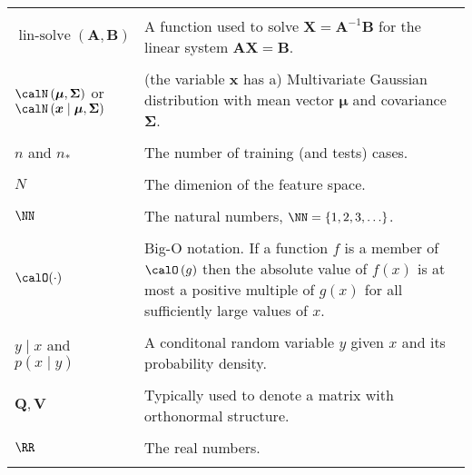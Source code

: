 \begin{longtable}{lp{}}
    \\\\
    $\operatorname{lin-solve} \left( \bm{A}, \bm{B} \right)$                                                   & A function used to solve $\bm{X} = \bm{A}^{-1} \bm{B}$ for the linear system $\bm{A} \bm{X} = \bm{B}$.
    \\\\
    $\calN \left( \bm{\mu} , \bm{\Sigma} \right)$ or $\calN \left( \bm{x} \mid \bm{\mu} , \bm{\Sigma} \right)$ & (the variable $\bm{x}$ has a) Multivariate Gaussian distribution with mean vector $\bm{\mu}$ and covariance $\bm{\Sigma}$.
    \\\\
    $n$ and $n_{\ast}$                                                                                         & The number of training (and tests) cases.
    \\\\
    $N$                                                                                                        & The dimenion of the feature space.
    \\\\
    $\NN$                                                                                                      & The natural numbers, $\NN = \left\{ 1,2,3,\ldots \right\}$.
    \\\\
    $\calO (\cdot)$                                                                                            & Big-O notation. If a function $f$ is a member of $\calO \left( g \right)$ then the absolute value of $f(x)$ is at most a positive multiple of $g(x)$ for all sufficiently large values of $x$.
    \\\\
    $y \mid x$ and $p \left( x \mid y \right)$                                                                 & A conditonal random variable $y$ given $x$ and its probability density.
    \\\\
    $\bm{Q}, \bm{V}$                                                                                           & Typically used to denote a matrix with orthonormal structure.
    \\\\
    $\RR$                                                                                                      & The real numbers.
    \\\\

\end{longtable}
